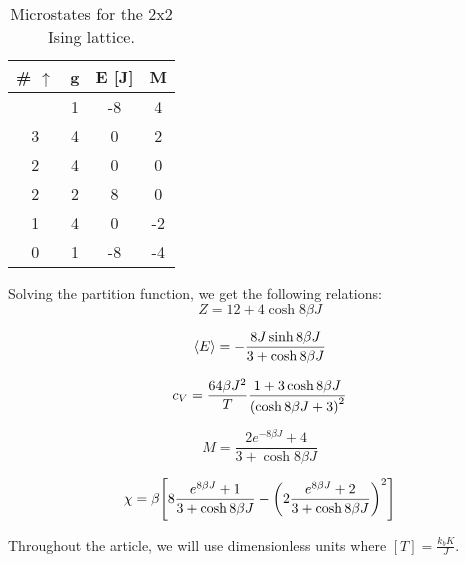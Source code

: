 \begin{table}[htbp]
	\centering
	\begin{tabular}{cccc}
		\# $\uparrow$ & g & E [J] & M \\
		\hline
		\addlinespace[0.1cm]
		4                   & 1          & -8    & 4             \\
		3                   & 4          & 0      & 2             \\
		2                   & 4          & 0      & 0             \\
		2                   & 2          & 8     & 0             \\
		1                   & 4          & 0      & -2            \\
		0                   & 1          & -8    & -4           
	\end{tabular}
	\caption{Microstates for the 2x2 Ising lattice.}
	\label{table:analytic}
\end{table}

 Solving the partition function, we get the following relations:
  \begin{equation}
  \label{eq:analyticpartition}
    Z = 12 + 4\cosh{8\beta J}
  \end{equation}

  \begin{equation}
  \label{eq:analyticenergy}
    \expval{E} = -\frac{8J\sinh{8\beta J}}{3 + \cosh{8\beta J}}
  \end{equation}

  \begin{equation}
  \label{eq:analyticheatcap}
    c_V = \frac{64 \beta J^2}{T} \frac{1 + 3\cosh{8 \beta J}}{\qty(\cosh{8\beta J} + 3)^2}
  \end{equation}

  \begin{equation}
  \label{analyticmagnet}
    M = \frac{2e^{-8 \beta J} + 4}{3 + \cosh{8 \beta J}}
  \end{equation}

  \begin{equation}
  \label{analyticsuscept}
    \chi = \beta\qty[8\frac{e^{8\beta J} + 1}{3 + \cosh{8\beta J}} - \qty(2\frac{e^{8\beta J} + 2}{3 + \cosh{8 \beta J}})^2 ]
  \end{equation}
 
Throughout the article, we will use dimensionless units where $[T] = \frac{k_bK}{J}$.

